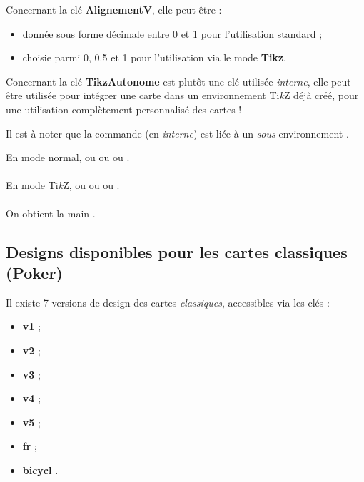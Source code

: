 \documentclass[a4paper]{article}
\providecommand\tikzlogo{Ti\textit{k}Z}
\let\TikZ\tikzlogo
\newcommand\ctex[1]{\tcbox[vignettelatex]{#1}\xspace}
\newcommand\cmaj[1]{\tcbox[vignetteMaJ]{#1}\xspace}
\newcommand\Cle[1]{{\bfseries\sffamily\textlangle #1\textrangle}}
\begin{document}
{{{{{{{{{{{\begin{codeinfo}
Concernant la clé \Cle{AlignementV}, elle peut être  :

\begin{itemize}
	\item donnée sous forme décimale entre 0 et 1 pour l'utilisation standard ;
	\item choisie parmi 0, 0.5 et 1 pour l'utilisation via le mode \Cle{Tikz}.
\end{itemize}
\end{codeinfo}

\begin{codeinfo}
Concernant la clé \Cle{TikzAutonome} est plutôt une clé utilisée \textit{interne}, elle peut être utilisée pour intégrer une carte dans un environnement \TikZ{} déjà créé, pour une utilisation complètement personnalisé des cartes !

\smallskip

Il est à noter que la commande (en \textit{interne}) est liée à un \textit{sous}-environnement \ctex{scope}.
\end{codeinfo}

\begin{codetex}[]
En mode normal,  ou  ou
 ou .\\ \\
En mode \TikZ, 
ou 
ou 
ou .\\ \\
On obtient la main .
\end{codetex}

\pagebreak

\subsection{Designs disponibles pour les cartes classiques (Poker)}

\begin{codeinfo}
Il existe 7 versions de design des cartes \textit{classiques}, accessibles via les clés :
\vspace*{-0.75\baselineskip}
\begin{multicols}{4}
\begin{itemize}
	\item \Cle{v1} ;
	\item \Cle{v2} ;
	\item \Cle{v3} ;
	\item \Cle{v4} ;
	\item \Cle{v5} ;
	\item \Cle{fr} \cmaj{0.2.4} ;
	\item \Cle{bicycl} \cmaj{0.2.4}.
\end{itemize}
\end{multicols}
\end{codeinfo}

}}}}}}}}}}}
\end{document}
